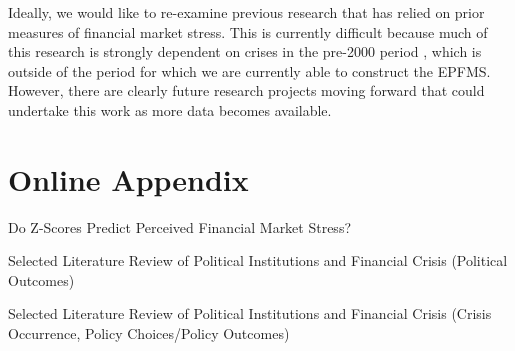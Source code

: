 \documentclass[]{article}
\begin{document}
Ideally, we would like to re-examine previous research that has relied on prior measures of financial market stress. This is currently difficult because much of this research is strongly dependent on crises in the pre-2000 period \citep[see][]{GandrudHallerberg2015}, which is outside of the period for which we are currently able to construct the EPFMS. However, there are clearly future research projects moving forward that could undertake this work as more data becomes available.




\clearpage

\section*{Online Appendix}


\begin{table}
    \caption{Do Z-Scores Predict Perceived Financial Market Stress?}
    \label{epfms_z_regress}

    \begin{center}
        
    \end{center}
\end{table}


\begin{table}[H]
\caption{Selected Literature Review of Political Institutions and Financial
Crisis (Political Outcomes)}


\label{LitRevTable2}
\begin{center}

\vspace{0.5cm}
\scalebox{0.9}{

}
\end{center}
\end{table}

\begin{table}[H]
\caption{Selected Literature Review of Political Institutions and Financial
Crisis (Crisis Occurrence, Policy Choices/Policy Outcomes)}


\label{LitRevTable}
\begin{center}

\vspace{0.5cm}
{\tiny{

}}
\end{center}
\end{table}
\end{document}
